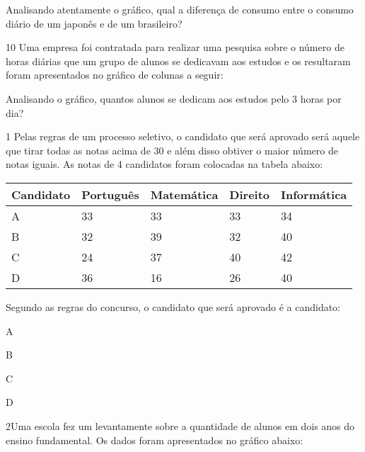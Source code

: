 {Analisando atentamente o gráfico, qual a diferença de consumo entre o
consumo diário de um japonês e de um brasileiro?



\num{10} Uma empresa foi contratada para realizar uma pesquisa sobre o
número de horas diárias que um grupo de alunos se dedicavam aos estudos
e os resultaram foram apresentados no gráfico de colunas a seguir:


Analisando o gráfico, quantos alunos se dedicam aos estudos pelo 3 horas
por dia?




\num{1} Pelas regras de um processo seletivo, o candidato que será aprovado
será aquele que tirar todas as notas acima de 30 e além disso obtiver o
maior número de notas iguais. As notas de 4 candidatos foram colocadas
na tabela abaixo:

\begin{longtable}[]{@{}lllll@{}}
\toprule
Candidato & Português & Matemática & Direito &
Informática\tabularnewline
\midrule
\endhead
A & 33 & 33 & 33 & 34\tabularnewline
B & 32 & 39 & 32 & 40\tabularnewline
C & 24 & 37 & 40 & 42\tabularnewline
D & 36 & 16 & 26 & 40\tabularnewline
\bottomrule
\end{longtable}

Segundo as regras do concurso, o candidato que será aprovado é a
candidato:

\begin{escolha}
\item
  A
\item
  B
\item
  C
\item
  D
\end{escolha}



\num{2}Uma escola fez um levantamente sobre a quantidade de alunos em dois
anos do ensino fundamental. Os dados foram apresentados no gráfico
abaixo:

}
